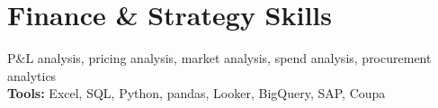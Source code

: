 \documentclass[11pt,a4paper,sans]{moderncv} %
\makeatletter
\newcommand*{\customcventry}[5][0.8em]{
  \begin{tabular}{@{}l}
    \fontsize{12}{12}{\bfseries #2}, {\itshape #3}
  \end{tabular}
  \hfill%
  \begin{tabular}{l@{}}
    \fontsize{12}{12}{\itshape #4}
  \end{tabular}
  \ifx&#5&%
  \else{
    \par\addvspace{0.15em}
    \begin{minipage}{\maincolumnwidth}%
      #5%
    \end{minipage}}\fi%
  \par\addvspace{#1}}
\newcommand*{\customcawards}[4]{
  \begin{tabular}{@{}l}
    {#2}
  \end{tabular}
  \hfill%
  \begin{tabular}{l@{}}
      \bfseries \itshape #3
  \end{tabular}
  \ifx&#4&%
  \else{\\%
    \begin{minipage}{\maincolumnwidth}%
      #4%
    \end{minipage}}\fi%
  \par\addvspace{#1}}
\makeatother
\begin{document}




\section{Finance \& Strategy Skills}
 P\&L analysis, pricing analysis, market analysis, spend analysis, procurement analytics\\
{\bfseries Tools:} Excel, SQL, Python, pandas, Looker, BigQuery, SAP, Coupa

\end{document}
